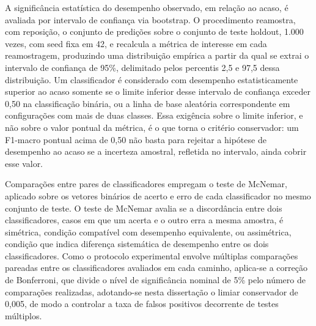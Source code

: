A significância estatística do desempenho observado, em relação ao acaso, é avaliada por intervalo de confiança via bootstrap. O procedimento reamostra, com reposição, o conjunto de predições sobre o conjunto de teste holdout, 1.000 vezes, com seed fixa em 42, e recalcula a métrica de interesse em cada reamostragem, produzindo uma distribuição empírica a partir da qual se extrai o intervalo de confiança de 95\%, delimitado pelos percentis 2,5 e 97,5 dessa distribuição. Um classificador é considerado com desempenho estatisticamente superior ao acaso somente se o limite inferior desse intervalo de confiança exceder 0,50 na classificação binária, ou a linha de base aleatória correspondente em configurações com mais de duas classes. Essa exigência sobre o limite inferior, e não sobre o valor pontual da métrica, é o que torna o critério conservador: um F1-macro pontual acima de 0,50 não basta para rejeitar a hipótese de desempenho ao acaso se a incerteza amostral, refletida no intervalo, ainda cobrir esse valor.

Comparações entre pares de classificadores empregam o teste de McNemar, aplicado sobre os vetores binários de acerto e erro de cada classificador no mesmo conjunto de teste. O teste de McNemar avalia se a discordância entre dois classificadores, casos em que um acerta e o outro erra a mesma amostra, é simétrica, condição compatível com desempenho equivalente, ou assimétrica, condição que indica diferença sistemática de desempenho entre os dois classificadores. Como o protocolo experimental envolve múltiplas comparações pareadas entre os classificadores avaliados em cada caminho, aplica-se a correção de Bonferroni, que divide o nível de significância nominal de 5\% pelo número de comparações realizadas, adotando-se nesta dissertação o limiar conservador de 0,005, de modo a controlar a taxa de falsos positivos decorrente de testes múltiplos.

